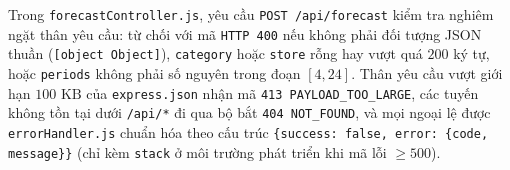 Trong \texttt{forecastController.js}, yêu cầu \texttt{POST /api/forecast} kiểm tra nghiêm ngặt thân yêu cầu: từ chối với mã \texttt{HTTP 400} nếu không phải đối tượng JSON thuần (\texttt{[object Object]}), \texttt{category} hoặc \texttt{store} rỗng hay vượt quá $200$ ký tự, hoặc \texttt{periods} không phải số nguyên trong đoạn $[4, 24]$. Thân yêu cầu vượt giới hạn $100\text{ KB}$ của \texttt{express.json} nhận mã \texttt{413 PAYLOAD_TOO_LARGE}, các tuyến không tồn tại dưới \texttt{/api/*} đi qua bộ bắt \texttt{404 NOT_FOUND}, và mọi ngoại lệ được \texttt{errorHandler.js} chuẩn hóa theo cấu trúc \texttt{\{success: false, error: \{code, message\}\}} (chỉ kèm \texttt{stack} ở môi trường phát triển khi mã lỗi $\ge 500$).

